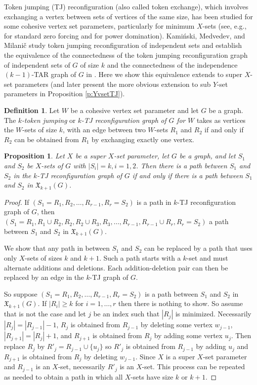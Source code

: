 \documentclass{article}
\numberwithin{figure}{section}
\numberwithin{table}{section}
\numberwithin{equation}{section}
\newtheorem{prop}[thm]{Proposition}
\theoremstyle{definition}
\theoremstyle{definition}
\newtheorem{defn}[thm]{Definition}
\theoremstyle{definition}
\newcommand{\bpf}{\begin{proof}}
\newcommand{\epf}{\end{proof}\ms}
\newcommand{\ms}{\medskip}
\newcommand{\xtar}{\mathfrak{X}}%
\begin{document}
{ Token jumping (TJ) reconfiguration (also called token exchange), which  involves exchanging a vertex between sets of vertices of the same size, has been studied for some cohesive vertex set parameters, particularly for minimum $X$-sets  (see, e.g., \cite{GHH} for standard zero forcing and \cite{PDrecon} for power domination).
Kami\'nski, Medvedev, and Milani\v c study token jumping reconfiguration of independent sets and establish the equivalence of the connectedness of the token jumping reconfiguration graph of independent sets of $G$ of size $k$ and the connectedness of the independence $(k-1)$-TAR graph of $G$ in \cite{KMM12}.
Here we show this equivalence extends to   super $X$-set parameters (and later present the more obvious extension to sub $Y$-set parameters in Proposition \ref{p:YvsetTJ}).  %

\begin{defn}
Let $W$ be a cohesive vertex set parameter and let $G$ be a graph.  The  \emph{$k$-token jumping} or  \emph{$k$-TJ reconfiguration graph of $G$ for $W$} takes as vertices  the $W$-sets of size $k$, with an edge between two $W$-sets $R_1$ and $R_2$ if and only if $R_2$ can be obtained from $R_1$ by %
exchanging exactly one vertex.  
\end{defn}

\begin{prop} \label{p:vsetTJ}
Let $X$ be a super $X$-set parameter, let $G$ be a graph, and let  $S_1$ and $S_2$ be $X$-sets of $G$  with $|S_i|=k, i=1,2$. Then there is a path between  $S_1$ and $S_2$ in the $k$-TJ reconfiguration graph of $G$  if and only if there is a path between  $S_1$ and $S_2$ in $\xtar_{k+1}(G)$.     
\end{prop}
\bpf If $(S_1=R_1,R_2,\dots,R_{r-1},R_r=S_2)$ is a path in  $k$-TJ reconfiguration graph of $G$, then $(S_1=R_1,R_1\cup R_2,R_2, R_2\cup R_3, R_3,\dots,R_{r-1},R_{r-1}\cup R_r,R_r=S_2)$ a path between  $S_1$ and $S_2$ in $\xtar_{k+1}(G)$.

We show that any path in between $S_1$ and $S_2$ can be replaced by a path that uses only $X$-sets of sizes $k$ and $k+1$.  Such a path starts with a $k$-set and must alternate additions and deletions.  Each addition-deletion pair  can then be replaced by an edge in the $k$-TJ graph of $G$. 

So suppose $(S_1=R_1,R_2,\dots,R_{r-1},R_r=S_2)$ is a path  between  $S_1$ and $S_2$ in $\xtar_{k+1}(G)$. If $|R_i|\ge k$ for $i=1,\dots,r$ then there is nothing to show.  So assume that is not the case and let $j$ be an   index such that $|R_j|$ is minimized. Necessarily $|R_j|=|R_{j-1}|-1$,  $R_j$ is obtained from $R_{j-1}$ by deleting some vertex $w_{j-1}$, $|R_{j+1}|=|R_{j}|+1$, and $R_{j+1}$ is obtained from $R_{j}$ by adding some vertex $u_{j}$.  Then replace $R_j$ by $R'_j=R_{j-1}\cup\{u_j\}$ so $R'_j$ is obtained from $R_{j-1}$ by adding $u_j$ and $R_{j+1}$ is obtained from $R_j$ by deleting $w_{j-1}$.  Since $X$ is a super $X$-set parameter and $R_{j-1}$ is an $X$-set, necessarily $R'_j$ is an $X$-set. This process can be repeated as needed to obtain a path in which all $X$-sets have size $k$ or $k+1$. 
\epf


}
\end{document}
